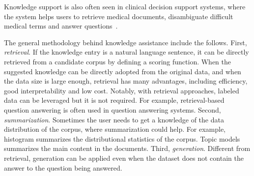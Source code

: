 Knowledge support is also often seen in clinical decision support systems, where the system helps users to retrieve medical documents, disambiguate difficult medical terms and answer questions~\cite{sankhavara2018biomedical}. 

The general methodology behind knowledge assistance include the follows. First, \emph{retrieval}. If the knowledge entry is a natural language sentence, it can be directly retrieved from a candidate corpus by defining a scoring function. When the suggested knowledge can be directly adopted from the original data, and when the data size is large enough, retrieval has many advantages, including efficiency, good interpretability and low cost. Notably, with retrieval approaches, labeled data can be leveraged but it is not required. For example, retrieval-based question answering is often used in question answering systems. Second, \emph{summarization}. Sometimes the user needs to get a knowledge of the data distribution of the corpus, where summarization could help. For example, histogram summarizes the distributional statistics of the corpus. Topic models summarizes the main content in the documents. Third, \emph{generation}. Different from retrieval, generation can be applied even when the dataset does not contain the answer to the question being answered. 
